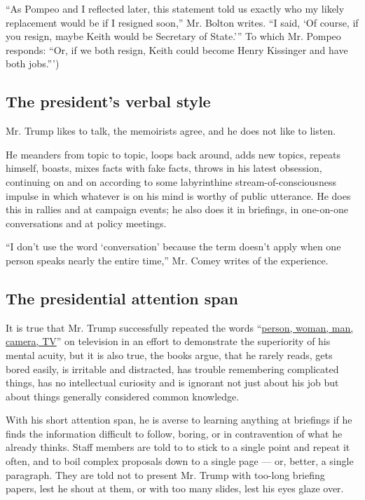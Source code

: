 ``As Pompeo and I reflected later, this statement told us exactly who my
likely replacement would be if I resigned soon,'' Mr. Bolton writes. ``I
said, `Of course, if you resign, maybe Keith would be Secretary of
State.''' To which Mr. Pompeo responds: ``Or, if we both resign, Keith
could become Henry Kissinger and have both jobs.''')

\hypertarget{the-presidents-verbal-style}{%
\subsection{The president's verbal
style}\label{the-presidents-verbal-style}}

Mr. Trump likes to talk, the memoirists agree, and he does not like to
listen.

He meanders from topic to topic, loops back around, adds new topics,
repeats himself, boasts, mixes facts with fake facts, throws in his
latest obsession, continuing on and on according to some labyrinthine
stream-of-consciousness impulse in which whatever is on his mind is
worthy of public utterance. He does this in rallies and at campaign
events; he also does it in briefings, in one-on-one conversations and at
policy meetings.

``I don't use the word `conversation' because the term doesn't apply
when one person speaks nearly the entire time,'' Mr. Comey writes of the
experience.

\hypertarget{the-presidential-attention-span}{%
\subsection{The presidential attention
span}\label{the-presidential-attention-span}}

It is true that Mr. Trump successfully repeated the words
``\href{https://www.nytimes3xbfgragh.onion/2020/07/23/us/politics/person-woman-man-camera-tv-trump.html}{person,
woman, man, camera, TV}'' on television in an effort to demonstrate the
superiority of his mental acuity, but it is also true, the books argue,
that he rarely reads, gets bored easily, is irritable and distracted,
has trouble remembering complicated things, has no intellectual
curiosity and is ignorant not just about his job but about things
generally considered common knowledge.

With his short attention span, he is averse to learning anything at
briefings if he finds the information difficult to follow, boring, or in
contravention of what he already thinks. Staff members are told to to
stick to a single point and repeat it often, and to boil complex
proposals down to a single page --- or, better, a single paragraph. They
are told not to present Mr. Trump with too-long briefing papers, lest he
shout at them, or with too many slides, lest his eyes glaze over.

